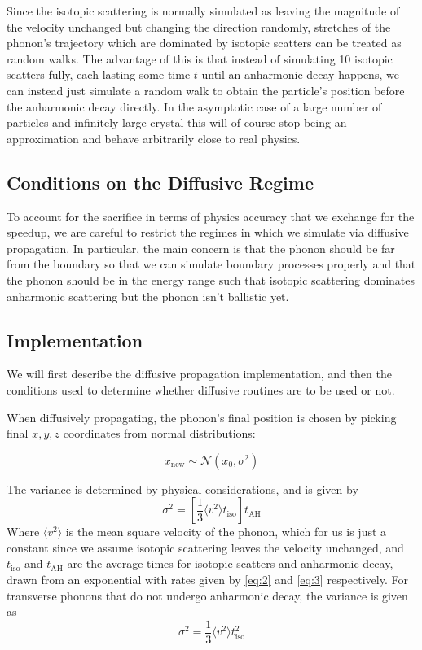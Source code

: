 \documentclass[11pt]{article}
\begin{document}
Since the isotopic scattering is normally simulated as leaving the magnitude of the velocity unchanged but changing the direction randomly, 
stretches of the phonon's trajectory which are dominated by isotopic scatters can be treated as random walks. The advantage of this is that
instead of simulating 10 isotopic scatters fully, each lasting some time $t$ until an anharmonic decay happens, we can instead just simulate a 
random walk to obtain the particle's position before the anharmonic decay directly. In the asymptotic case of a large number of particles 
and infinitely large crystal this will of course stop being an approximation and behave arbitrarily close to real physics. 

\subsection*{Conditions on the Diffusive Regime}
To account for the sacrifice in terms of physics accuracy that we exchange for the speedup, we are careful to restrict the regimes in which we 
simulate via diffusive propagation. In particular, the main concern is that the phonon should be far from the boundary so that we can simulate
boundary processes properly and that the phonon should be in the energy range such that isotopic scattering dominates anharmonic scattering 
but the phonon isn't ballistic yet. 

\subsection*{Implementation}
We will first describe the diffusive propagation implementation, and then the conditions used to determine whether diffusive routines are to be used
or not. 

When diffusively propagating, the phonon's final position is chosen by picking final $x, y, z$ coordinates from normal distributions:

\begin{equation}
x_{\text{new}} \sim \mathcal{N}(x_0, \sigma^2)
\end{equation}

The variance is determined by physical considerations, and is given by
\begin{equation}
\sigma^2 = \left[\frac{1}{3}\langle v^2 \rangle t_{\text{iso}}\right]t_{\text{AH}}
\end{equation}
Where $\langle v^2 \rangle$ is the mean square velocity of the phonon, which for us is just a constant since we assume isotopic scattering 
leaves the velocity unchanged, and $t_{\text{iso}}$ and $t_{\text{AH}}$  are the average times for isotopic scatters and anharmonic decay, drawn 
from an exponential with rates given by \eqref{eq:2} and \eqref{eq:3} respectively. For transverse phonons that do not undergo anharmonic decay,
the variance is given as 
\begin{equation}
\sigma^2 = \frac{1}{3}\langle v^2 \rangle t_{\text{iso}}^2
\end{equation}
\end{document}

